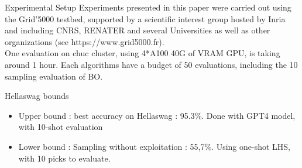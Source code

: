 \begin{frame}{Experimental Setup}
    Experiments presented in this paper were carried out using the Grid'5000 testbed, supported by a scientific interest group hosted by Inria and including CNRS, RENATER and several Universities as well as other organizations (see https://www.grid5000.fr).\\


    One evaluation on chuc cluster, using 4*A100 40G of VRAM GPU, is taking around 1 hour. Each algorithms have a budget of 50 evaluations, including the 10 sampling evaluation of BO. 

    \begin{block}{Hellaswag bounds}
        \begin{itemize}
            \item Upper bound : best accuracy on Hellaswag : 95.3\%. Done with GPT4 model, with 10-shot evaluation
            \item Lower bound : Sampling without exploitation : 55,7\%. Using one-shot LHS, with 10 picks to evaluate.
        \end{itemize}
        
        
    \end{block}
    
\end{frame}
